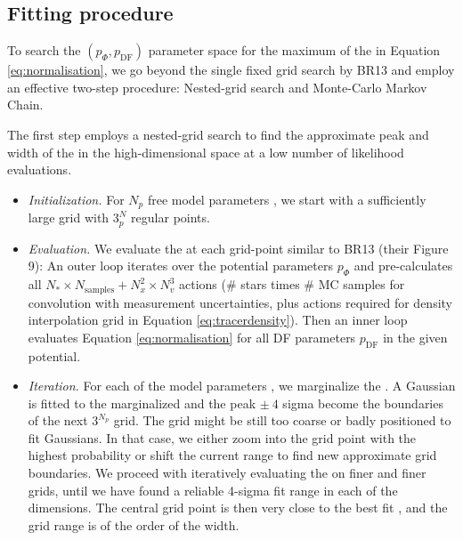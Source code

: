 \subsection{Fitting procedure} \label{sec:fitting}

To search the $(p_\Phi,p_\text{DF})$ parameter space for the maximum of the \pdf{} in Equation \ref{eq:normalisation}, we go beyond the single fixed grid search by BR13 and employ an effective two-step procedure: Nested-grid search and Monte-Carlo Markov Chain.

The first step employs a nested-grid search to find the approximate peak and width of the \pdf{} in the high-dimensional \pmodel{}  space at a low number of likelihood evaluations.

\begin{itemize}
\item \emph{Initialization.} For $N_p$ free model parameters \pmodel{}, we start with a sufficiently large grid with $3^N_p$ regular points.

\item  \emph{Evaluation.} We evaluate the \pdf{} at each grid-point similar to BR13 (their Figure 9):  An outer loop iterates over the potential parameters $p_\Phi$ and pre-calculates all $N_* \times N_\text{samples} + N_x^2 \times N_v^3$ actions (\# stars times \# MC samples for convolution with measurement uncertainties, plus actions required for density interpolation grid in Equation \ref{eq:tracerdensity}). Then an inner loop evaluates Equation \ref{eq:normalisation} for all DF parameters $p_\text{DF}$ in the given potential.

\item \emph{Iteration.} For each of the model parameters \pmodel{}, we marginalize the \pdf{}. A Gaussian is fitted to the marginalized \pdf{} and the peak $\pm ~ 4$ sigma become the boundaries of the next $3^{N_p}$ grid. The grid might be still too coarse or badly positioned to fit Gaussians. In that case, we either zoom into the grid point with the highest probability or shift the current range to find new approximate grid boundaries. We proceed with iteratively evaluating the \pdf{} on finer and finer grids, until we have found a reliable 4-sigma fit range in each of the \pmodel{} dimensions. The central grid point is then very close to the best fit \pmodel{}, and the grid range is of the order of the \pdf{} width.


\end{itemize}
